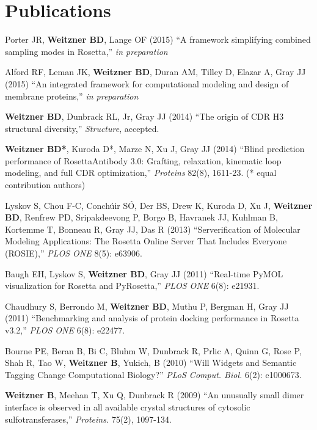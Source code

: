 \documentclass[12pt]{scrartcl}
\newcommand{\allcapsspacing}[1]{{\addfontfeature{LetterSpace=7.5}#1}}
\begin{document}
\section*{\allcapsspacing{Publications}}
\begin{etaremune}
\item Porter JR, \textbf{Weitzner BD}, Lange OF (2015) ``A framework simplifying combined sampling modes in Rosetta,'' \textit{in preparation}
\item Alford RF, Leman JK, \textbf{Weitzner BD}, Duran AM, Tilley D, Elazar A, Gray JJ (2015) ``An integrated framework for computational modeling and design of membrane proteins,'' \textit{in preparation}
\item \textbf{Weitzner BD}, Dunbrack RL, Jr, Gray JJ (2014) ``The origin of CDR H3 structural diversity,'' \textit{Structure}, accepted.
\item \textbf{Weitzner BD*}, Kuroda D*, Marze N, Xu J, Gray JJ (2014) ``Blind prediction performance of RosettaAntibody 3.0: Grafting, relaxation, kinematic loop modeling, and full CDR optimization,'' \textit{Proteins} 82(8), 1611-23. (* equal contribution authors)
\item Lyskov S, Chou F-C, Conch{\'u}ir S{\'O}, Der BS, Drew K, Kuroda D, Xu J, \textbf{Weitzner BD}, Renfrew PD, Sripakdeevong P, Borgo B, Havranek JJ, Kuhlman B, Kortemme T, Bonneau R, Gray JJ, Das R (2013) ``Serverification of Molecular Modeling Applications: The Rosetta Online Server That Includes Everyone (ROSIE),'' \textit{PLOS ONE} 8(5): e63906.
\item Baugh EH, Lyskov S, \textbf{Weitzner BD}, Gray JJ (2011) ``Real-time PyMOL visualization for Rosetta and PyRosetta,'' \textit{PLOS ONE} 6(8): e21931.
\item Chaudhury S, Berrondo M, \textbf{Weitzner BD}, Muthu P, Bergman H, Gray JJ (2011) ``Benchmarking and analysis of protein docking performance in Rosetta v3.2,'' \textit{PLOS ONE} 6(8): e22477.
\item Bourne PE, Beran B, Bi C, Bluhm W, Dunbrack R, Prlic A, Quinn G, Rose P, Shah R, Tao W, \textbf{Weitzner B}, Yukich, B (2010) ``Will Widgets and Semantic Tagging Change Computational Biology?'' \textit{PLoS Comput. Biol.} 6(2): e1000673.
\item \textbf{Weitzner B}, Meehan T, Xu Q, Dunbrack R (2009) ``An unusually small dimer interface is observed in all available crystal structures of cytosolic sulfotransferases,'' \textit{Proteins.} 75(2), 1097-134.
\end{etaremune}
\end{document}
